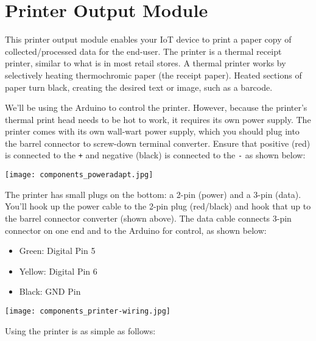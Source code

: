 
\section{Printer Output Module}
\label{sec-output-printer}

This printer output module enables your IoT device to print a paper copy of
collected/processed data for the end-user.  The printer is a thermal receipt
printer, similar to what is in most retail stores.  A thermal printer works by
selectively heating thermochromic paper (the receipt paper).  Heated sections of
paper turn black, creating the desired text or image, such as a barcode.

We'll be using the Arduino to control the printer.  However, because the
printer's thermal print head needs to be hot to work, it requires its own power
supply.  The printer comes with its own wall-wart power supply, which you should
plug into the barrel connector to screw-down terminal converter.  Ensure that
positive (red) is connected to the \texttt{+} and negative (black) is connected
to the \texttt{-} as shown below:

\begin{center}
\texttt{[image: components\_poweradapt.jpg]}
\end{center}

The printer has small plugs on the bottom: a 2-pin (power) and a 3-pin (data).
You'll hook up the power cable to the 2-pin plug (red/black) and hook that up to
the barrel connector converter (shown above).  The data cable connects 3-pin
connector on one end and to the Arduino for control, as shown below:

\begin{itemize}
\item Green: Digital Pin 5
\item Yellow: Digital Pin 6
\item Black: GND Pin
\end{itemize}

\begin{center}
\texttt{[image: components\_printer-wiring.jpg]}
\end{center}

\newpage

Using the printer is as simple as follows:

